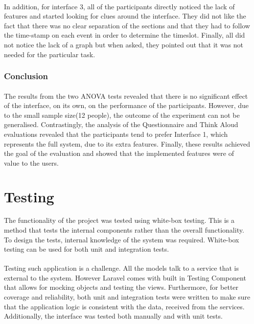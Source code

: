 \documentclass{l4proj}
\begin{document}
\paragraph{}
In addition, for interface 3, all of the participants directly noticed the lack of features and started looking for clues around the interface. They did not like the fact that there was no clear separation of the sections and that they had to follow the time-stamp on each event in order to determine the timeslot. Finally, all did not notice the lack of a graph but when asked, they pointed out that it was not needed for the particular task.

\subsubsection{Conclusion}
\paragraph{}
The results from the two ANOVA tests revealed that there is no significant effect of the interface, on its own, on the performance of the participants. However, due to the small sample size(12 people), the outcome of the experiment can not be generalised. Contrastingly, the analysis of the Questionnaire and Think Aloud evaluations revealed that the participants tend to prefer Interface 1, which represents the full system, due to its extra features. Finally, these results achieved the goal of the evaluation and showed that the implemented features were of value to the users.       

\section{Testing}
\paragraph{}
The functionality of the project was tested using white-box testing. This is a method that tests the internal components rather than the overall functionality. To design the tests, internal knowledge of the system was required. White-box testing can be used for both unit and integration tests.
\paragraph{}
Testing such application is a challenge. All the models talk to a service that is external to the system. However Laravel comes with built in Testing Component that allows for mocking objects and testing the views. Furthermore, for better coverage and reliability, both unit and integration tests were written to make sure that the application logic is consistent with the data, received from the services. Additionally, the interface was tested both manually and with unit tests. 
\end{document}
